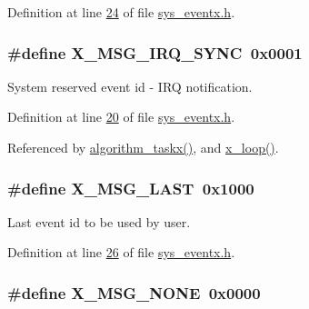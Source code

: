 Definition at line \hyperlink{a00036_source_l00024}{24} of file \hyperlink{a00036_source}{sys\+\_\+eventx.\+h}.

\hypertarget{a00036_a104f1137aafb33160da80932fe63c40d}{
\subsubsection[{X\+\_\+\+M\+S\+G\+\_\+\+I\+R\+Q\+\_\+\+S\+Y\+N\+C}]{\setlength{\rightskip}{0pt plus 5cm}\#define X\+\_\+\+M\+S\+G\+\_\+\+I\+R\+Q\+\_\+\+S\+Y\+N\+C~0x0001}}\label{a00036_a104f1137aafb33160da80932fe63c40d}


System reserved event id -\/ I\+R\+Q notification. 



Definition at line \hyperlink{a00036_source_l00020}{20} of file \hyperlink{a00036_source}{sys\+\_\+eventx.\+h}.



Referenced by \hyperlink{a00038_source_l01905}{algorithm\+\_\+taskx()}, and \hyperlink{a00037_source_l00231}{x\+\_\+loop()}.

\hypertarget{a00036_afc95a839de2731289483d04a6cdaac1f}{
\subsubsection[{X\+\_\+\+M\+S\+G\+\_\+\+L\+A\+S\+T}]{\setlength{\rightskip}{0pt plus 5cm}\#define X\+\_\+\+M\+S\+G\+\_\+\+L\+A\+S\+T~0x1000}}\label{a00036_afc95a839de2731289483d04a6cdaac1f}


Last event id to be used by user. 



Definition at line \hyperlink{a00036_source_l00026}{26} of file \hyperlink{a00036_source}{sys\+\_\+eventx.\+h}.

\hypertarget{a00036_a4431051080c1f46fda1a2ce7d4931aa8}{
\subsubsection[{X\+\_\+\+M\+S\+G\+\_\+\+N\+O\+N\+E}]{\setlength{\rightskip}{0pt plus 5cm}\#define X\+\_\+\+M\+S\+G\+\_\+\+N\+O\+N\+E~0x0000}}\label{a00036_a4431051080c1f46fda1a2ce7d4931aa8}



